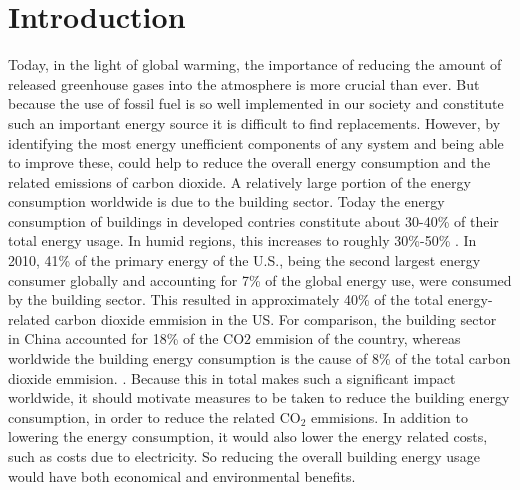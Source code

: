 \section{Introduction}
Today, in the light of global warming, the importance of reducing the amount of released
greenhouse gases into the atmosphere is more crucial than ever. But because the use of
fossil fuel is so well implemented in our society and constitute such an important energy source
it is difficult to find replacements. 
However, by identifying the most energy unefficient components of any system and being able 
to improve these, could help to reduce the overall energy consumption and the 
related emissions of carbon dioxide.
%
A relatively large portion of the energy consumption worldwide is due to
the building sector. 
Today the energy consumption of buildings in developed contries constitute about 30-40\%
of their total energy usage. In humid regions, this increases to roughly 30\%-50\% 
\cite{AlRabghi2001, Wilde2004, Kwak2010}. 
In 2010, 41\% of the primary energy of the U.S., being the second largest energy consumer 
globally and accounting for 7\% of the global energy use, were consumed by the building sector.
This resulted in approximately 40\% of the total energy-related carbon dioxide emmision in the US. 
For comparison, the building sector in China accounted for 18\% of the CO$2$ emmision of the country, 
whereas worldwide the building energy consumption is the cause of 8\% of the total carbon dioxide emmision.
\cite{buildingsEnergyDatabook, Hong2009}.
Because this in total makes such a significant impact worldwide, it should motivate 
measures to be taken to reduce the building energy consumption, in order to reduce the 
related CO$_2$ emmisions. In addition to lowering the energy consumption, it would also lower the 
energy related costs, such as costs due to electricity. So reducing the 
overall building energy usage would have both economical and environmental benefits. 
\\
\\
